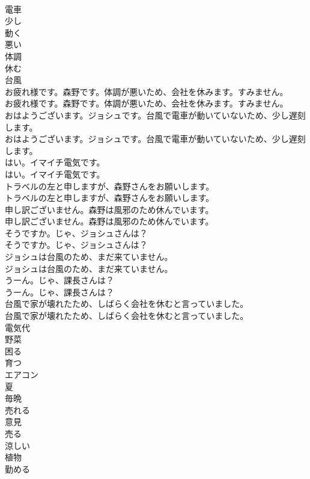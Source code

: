 \documentclass[8pt]{extreport}
\begin{document}
\begin{CJK}{UTF8}{min}
\\	電車
\\	少し
\\	動く
\\	悪い
\\	体調
\\	休む
\\	台風
\\	お疲れ様です。森野です。体調が悪いため、会社を休みます。すみません。	
\\	お疲れ様です。森野です。体調が悪いため、会社を休みます。すみません。 
\\	おはようございます。ジョシュです。台風で電車が動いていないため、少し遅刻します。	
\\	おはようございます。ジョシュです。台風で電車が動いていないため、少し遅刻します。 
\\	はい。イマイチ電気です。	
\\	はい。イマイチ電気です。 
\\	トラベルの左と申しますが、森野さんをお願いします。	
\\	トラベルの左と申しますが、森野さんをお願いします。 
\\	申し訳ございません。森野は風邪のため休んでいます。	
\\	申し訳ございません。森野は風邪のため休んでいます。 
\\	そうですか。じゃ、ジョシュさんは？	
\\	そうですか。じゃ、ジョシュさんは？ 
\\	ジョシュは台風のため、まだ来ていません。	
\\	ジョシュは台風のため、まだ来ていません。 
\\	うーん。じゃ、課長さんは？	
\\	うーん。じゃ、課長さんは？ 
\\	台風で家が壊れたため、しばらく会社を休むと言っていました。	
\\	台風で家が壊れたため、しばらく会社を休むと言っていました。 
\\	電気代
\\	野菜
\\	困る
\\	育つ
\\	エアコン
\\	夏
\\	毎晩
\\	売れる
\\	意見
\\	売る
\\	涼しい
\\	植物
\\	勤める

\end{CJK}
\end{document}
